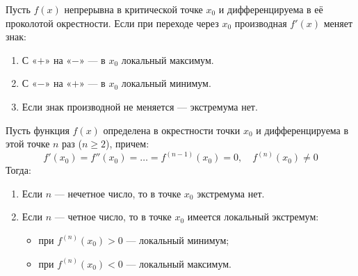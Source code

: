 \begin{theorem}
Пусть $f(x)$ непрерывна в критической точке $x_0$ и дифференцируема в её проколотой окрестности. Если при переходе через $x_0$ производная $f'(x)$ меняет знак:
\begin{enumerate}
    \item С «$+$» на «$-$» — в $x_0$ локальный максимум.
    \item С «$-$» на «$+$» — в $x_0$ локальный минимум.
    \item Если знак производной не меняется — экстремума нет.
\end{enumerate}
\end{theorem}

\begin{theorem}
Пусть функция $f(x)$ определена в окрестности точки $x_0$ и дифференцируема в этой точке $n$ раз ($n \ge 2$), причем:
\[ f'(x_0) = f''(x_0) = \dots = f^{(n-1)}(x_0) = 0, \quad f^{(n)}(x_0) \neq 0 \]
Тогда:
\begin{enumerate}
    \item Если $n$ — нечетное число, то в точке $x_0$ экстремума нет.
    \item Если $n$ — четное число, то в точке $x_0$ имеется локальный экстремум:
    \begin{itemize}
        \item при $f^{(n)}(x_0) > 0$ — локальный минимум;
        \item при $f^{(n)}(x_0) < 0$ — локальный максимум.
    \end{itemize}
\end{enumerate}
\end{theorem}


